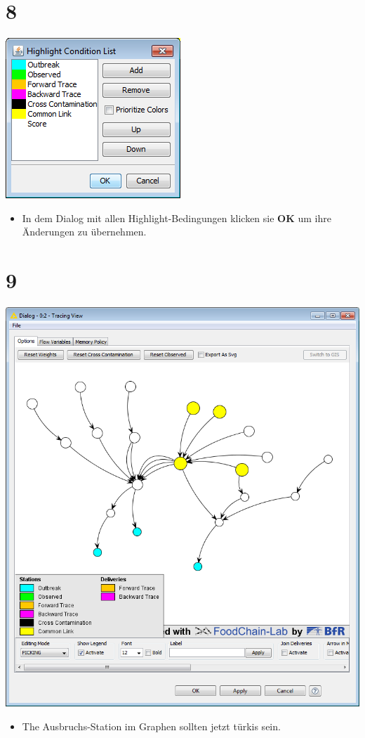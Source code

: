 \documentclass{beamer}
\begin{document}
\section{8}
\begin{frame}
	\begin{center}
  		\includegraphics[height=0.6\textheight]{8.png}
	\end{center}
	\begin{itemize}
		\item In dem Dialog mit allen Highlight-Bedingungen klicken sie \textbf{OK} um ihre Änderungen zu übernehmen.
	\end{itemize}
\end{frame}

\section{9}
\begin{frame}
	\begin{center}
  		\includegraphics[height=0.6\textheight]{9.png}
	\end{center}
	\begin{itemize}
		\item The Ausbruchs-Station im Graphen sollten jetzt türkis sein.
	\end{itemize}
\end{frame}
\end{document}
